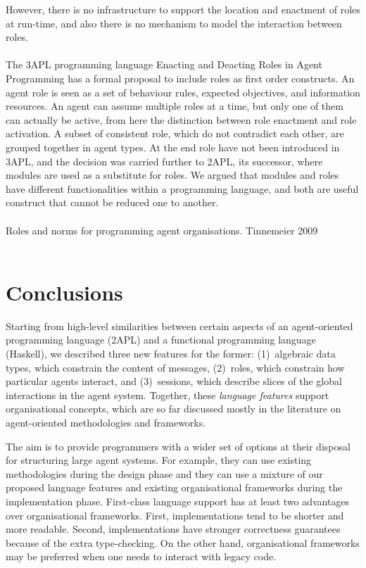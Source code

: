 \documentclass[a4paper,12pt,oneside,fleqn]{book} %
\theoremstyle{plain}
\theoremstyle{definition}
\theoremstyle{remark}
\begin{document}
However, there is no infrastructure to support the location and enactment
of roles at run-time, and also there is no mechanism to model the
interaction between roles. \\~\\ 

The 3APL programming language\cite{} Enacting and Deacting Roles in Agent
Programming has a formal proposal to include roles as first order
constructs. An agent role is seen as a set of behaviour rules, expected
objectives, and information resources. An agent can assume multiple roles
at a time, but only one of them can actually be active, from here the
distinction between role enactment and role activation. A subset of
consistent role, which do not contradict each other, are grouped together
in agent types. At the end role have not been introduced in 3APL, and the
decision was carried further to 2APL\cite{}, its successor, where modules
are used as a substitute for roles. We argued that modules and roles have
different functionalities within a programming language, and both are
useful construct that cannot be reduced one to another.\\~\\


Roles and norms for programming agent organisations. Tinnemeier 2009
\\~\\


\chapter{Conclusions}\label{ch:conc} %

Starting from high-level similarities between certain aspects of an
agent-oriented programming language (2APL) and a functional programming
language (Haskell), we described three new features for the former:
(1)~algebraic data types, which constrain the content of messages,
(2)~roles, which constrain how particular agents interact, and
(3)~sessions, which describe slices of the global interactions in the agent
system. Together, these \emph{language features} support organisational
concepts, which are so far discussed mostly in the literature on
agent-oriented methodologies and frameworks.

The aim is to provide programmers with a wider set of options at their disposal
for structuring large agent systems. For example, they can use existing
methodologies during the design phase and they can use a mixture of our
proposed language features and existing organisational frameworks during the
implementation phase. First-class language support has at least two
advantages over organisational frameworks. First, implementations tend to be
shorter and more readable. Second, implementations have stronger correctness
guarantees because of the extra type-checking. On the other hand,
organisational frameworks may be preferred when one needs to interact with
legacy code.
\end{document}
